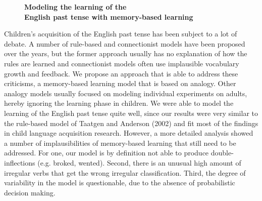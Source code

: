 \documentclass[10pt, a4paper, twopage, headinclude, footinclude, BCOR5mm]{book}
\begin{document}
\newpage

\begin{figure}[t!]
\centering
\large\textbf{Modeling the learning of the \\ English past tense with memory-based learning}
\vspace*{0.5cm}
\end{figure}


\begin{table}[t!]
\end{table} 
\noindent
Children's acquisition of the English past tense has been subject to a lot of debate. A number of rule-based and connectionist models have been proposed over the years, but the former approach usually has no explanation of how the rules are learned and connectionist models often use implausible vocabulary growth and feedback. We propose an approach that is able to address these criticisms, a memory-based learning model that is based on analogy. Other analogy models usually focused on modeling individual experiments on adults, hereby ignoring the learning phase in children. We were able to model the learning of the English past tense quite well, since our results were very similar to the rule-based model of Taatgen and Anderson (2002) and fit most of the findings in child language acquisition research. However, a more detailed analysis showed a number of implausibilities of memory-based learning that still need to be addressed. For one, our model is by definition not able to produce double-inflections (e.g. broked, wented). Second, there is an unusual high amount of irregular verbs that get the wrong irregular classification. Third, the degree of variability in the model is questionable, due to the absence of probabilistic decision making.   

\newpage
\end{document}
